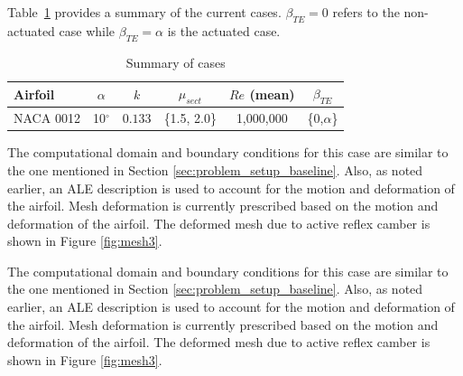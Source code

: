 Table~\ref{table:summary_cases_AC} provides a summary of the current cases. $\beta_{TE}=0$ refers to the non-actuated case while $\beta_{TE}=\alpha$ is the actuated case.

\begin{table}[H]
	\centering
	\caption{Summary of cases}
	\label{table:summary_cases_AC}
	\begin{tabular}{|l|c|c|c|c|c|}
		\hline
		Airfoil   & $\alpha$ & $k$ & $\mu_{sect}$ & $Re$ (mean) & $\beta_{TE}$\\
		\hline
		\hline
		NACA 0012 & 10$^\circ$ & $0.133$ & \{1.5, 2.0\} & 1,000,000 & \{0,$\alpha$\} \\
		\hline
		
	\end{tabular}
	
\end{table}

The computational domain and boundary conditions for this case are similar to the one mentioned in Section \ref{sec:problem_setup_baseline}.
Also, as noted earlier, an ALE description is used to account for the motion and deformation of the airfoil.
Mesh deformation is currently prescribed based on the motion and deformation of the airfoil.
The deformed mesh due to active reflex camber is shown in Figure \ref{fig:mesh3}.

The computational domain and boundary conditions for this case are similar to the one mentioned in Section \ref{sec:problem_setup_baseline}.
Also, as noted earlier, an ALE description is used to account for the motion and deformation of the airfoil.
Mesh deformation is currently prescribed based on the motion and deformation of the airfoil.
The deformed mesh due to active reflex camber is shown in Figure \ref{fig:mesh3}.


